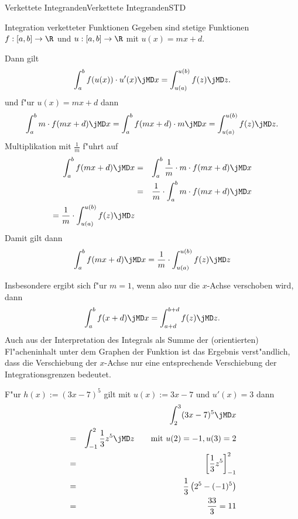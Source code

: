 \begin{MXContent}{Verkettete Integranden}{Verkettete Integranden}{STD}
\begin{MXInfo}{Integration verketteter Funktionen} 
Gegeben sind stetige Funktionen $f: [a, b] \rightarrow \R$ und 
$u: [a, b] \rightarrow \R$ mit $u(x) = m x + d$.

Dann gilt
\[
\int_{a}^{b} f(u(x)) \cdot u'(x) \jMD x %
= \int_{u(a)}^{u(b)} f(z) \jMD z. %
\]
und f"ur $u(x) = m x + d$ dann
\begin{equation}
\int_{a}^{b} m \cdot f(m x + d) \jMD x %
  =  \int_{a}^{b} f(m x + d) \cdot m \jMD x %
  =  \int_{u(a)}^{u(b)} f(z) \jMD z. %
\end{equation}
Multiplikation mit $\frac{1}{m}$ f"uhrt auf 
\begin{eqnarray*}
\int_{a}^{b} f(m x + d) \jMD x %
 & = & \int_{a}^{b} \frac{1}{m} \cdot m \cdot f(m x + d) \jMD x \\
 & = & \frac{1}{m} \cdot \int_{a}^{b} m \cdot f(m x + d) \jMD x \\
 = \frac{1}{m} \cdot \int_{u(a)}^{u(b)} f(z) \jMD z %
\end{eqnarray*}
Damit gilt dann
\[
\int_{a}^{b} f(m x + d) \jMD x %
 = \frac{1}{m} \cdot \int_{u(a)}^{u(b)} f(z) \jMD z %
\]
\end{MXInfo}

Insbesondere ergibt sich f"ur $m = 1$, wenn also nur die $x$-Achse verschoben
wird, dann
\[
\int_{a}^{b} f(x + d) \jMD x = \int_{a+d}^{b+d} f(z) \jMD z.
\]
Auch aus der Interpretation des Integrals als Summe der (orientierten) 
Fl"acheninhalt unter dem Graphen der Funktion ist das Ergebnis verst"andlich, 
dass die Verschiebung der $x$-Achse nur eine entsprechende Verschiebung der 
Integrationsgrenzen bedeutet.

\begin{MExample}
F"ur $h(x) := (3 x - 7)^5$ gilt mit $u(x) := 3 x - 7$ und $u'(x) = 3$ dann
\begin{eqnarray*}
 &  & \int_{2}^{3} (3 x - 7)^5 \jMD x \\
 & = & \int_{-1}^{2} \frac{1}{3} z^5 \jMD z %
  \qquad \text{mit } u(2) = -1, u(3) = 2 \\
 & = & \left[\frac{1}{3} z^5\right]_{-1}^{2} \\
 & = & \frac{1}{3} \left(2^5 - (-1)^5 \right) \\
 & = & \frac{33}{3} = 11 \\
\end{eqnarray*}
\end{MExample}



\end{MXContent}

